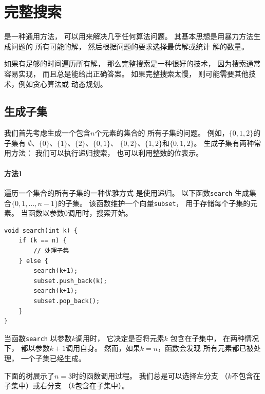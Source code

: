 \chapter{完整搜索}

是一种通用方法，
可以用来解决几乎任何算法问题。
其基本思想是用暴力方法生成问题的
所有可能的解，
然后根据问题的要求选择最优解或统计
解的数量。

如果有足够的时间遍历所有解，
那么完整搜索是一种很好的技术，
因为搜索通常容易实现，
而且总是能给出正确答案。
如果完整搜索太慢，
则可能需要其他技术，例如贪心算法或
动态规划。

\section{生成子集}


我们首先考虑生成一个包含$n$个元素的集合的
所有子集的问题。
例如，$\{0,1,2\}$的子集有
$\emptyset$、$\{0\}$、$\{1\}$、$\{2\}$、$\{0,1\}$、
$\{0,2\}$、$\{1,2\}$和$\{0,1,2\}$。
生成子集有两种常用方法：
我们可以执行递归搜索，
也可以利用整数的位表示。

\subsubsection{方法1}

遍历一个集合的所有子集的一种优雅方式
是使用递归。
以下函数\texttt{search}
生成集合$\{0,1,\ldots,n-1\}$的子集。
该函数维护一个向量\texttt{subset}，
用于存储每个子集的元素。
当函数以参数0调用时，搜索开始。

\begin{lstlisting}
void search(int k) {
    if (k == n) {
        // 处理子集
    } else {
        search(k+1);
        subset.push_back(k);
        search(k+1);
        subset.pop_back();
    }
}
\end{lstlisting}

当函数\texttt{search}
以参数$k$调用时，
它决定是否将元素$k$
包含在子集中，
在两种情况下，
都以参数$k+1$调用自身。
然而，如果$k=n$，函数会发现
所有元素都已被处理，
一个子集已经生成。

下面的树展示了$n=3$时的函数调用过程。
我们总是可以选择左分支
（$k$不包含在子集中）或右分支
（$k$包含在子集中）。


